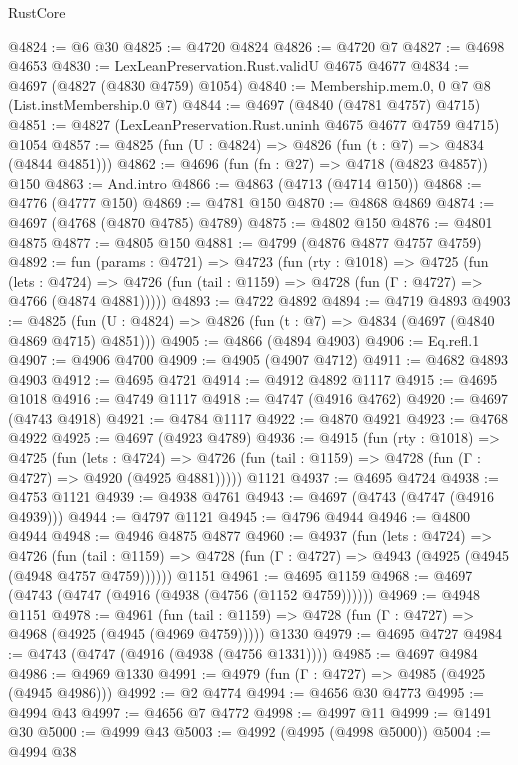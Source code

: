 \begin{lexlean}{RustCore}
\begin{coremodule}
@4824 := @6 @30
@4825 := @4720 @4824
@4826 := @4720 @7
@4827 := @4698 @4653
@4830 := LexLeanPreservation.Rust.validU @4675 @4677
@4834 := @4697 (@4827 (@4830 @4759) @1054)
@4840 := Membership.mem.{0, 0} @7 @8 (List.instMembership.{0} @7)
@4844 := @4697 (@4840 (@4781 @4757) @4715)
@4851 := @4827 (LexLeanPreservation.Rust.uninh @4675 @4677 @4759 @4715) @1054
@4857 := @4825 (fun (U : @4824) => @4826 (fun (t : @7) => @4834 (@4844 @4851)))
@4862 := @4696 (fun (fn : @27) => @4718 (@4823 @4857)) @150
@4863 := And.intro
@4866 := @4863 (@4713 (@4714 @150))
@4868 := @4776 (@4777 @150)
@4869 := @4781 @150
@4870 := @4868 @4869
@4874 := @4697 (@4768 (@4870 @4785) @4789)
@4875 := @4802 @150
@4876 := @4801 @4875
@4877 := @4805 @150
@4881 := @4799 (@4876 @4877 @4757 @4759)
@4892 := fun (params : @4721) =>
  @4723
    (fun (rty : @1018) =>
    @4725
      (fun (lets : @4724) =>
      @4726 (fun (tail : @1159) => @4728 (fun (Γ : @4727) => @4766 (@4874 @4881)))))
@4893 := @4722 @4892
@4894 := @4719 @4893
@4903 := @4825 (fun (U : @4824) => @4826 (fun (t : @7) => @4834 (@4697 (@4840 @4869 @4715) @4851)))
@4905 := @4866 (@4894 @4903)
@4906 := Eq.refl.{1}
@4907 := @4906 @4700
@4909 := @4905 (@4907 @4712)
@4911 := @4682 @4893 @4903
@4912 := @4695 @4721
@4914 := @4912 @4892 @1117
@4915 := @4695 @1018
@4916 := @4749 @1117
@4918 := @4747 (@4916 @4762)
@4920 := @4697 (@4743 @4918)
@4921 := @4784 @1117
@4922 := @4870 @4921
@4923 := @4768 @4922
@4925 := @4697 (@4923 @4789)
@4936 := @4915
    (fun (rty : @1018) =>
    @4725
      (fun (lets : @4724) =>
      @4726 (fun (tail : @1159) => @4728 (fun (Γ : @4727) => @4920 (@4925 @4881)))))
    @1121
@4937 := @4695 @4724
@4938 := @4753 @1121
@4939 := @4938 @4761
@4943 := @4697 (@4743 (@4747 (@4916 @4939)))
@4944 := @4797 @1121
@4945 := @4796 @4944
@4946 := @4800 @4944
@4948 := @4946 @4875 @4877
@4960 := @4937
    (fun (lets : @4724) =>
    @4726
      (fun (tail : @1159) => @4728 (fun (Γ : @4727) => @4943 (@4925 (@4945 (@4948 @4757 @4759))))))
    @1151
@4961 := @4695 @1159
@4968 := @4697 (@4743 (@4747 (@4916 (@4938 (@4756 (@1152 @4759))))))
@4969 := @4948 @1151
@4978 := @4961
    (fun (tail : @1159) => @4728 (fun (Γ : @4727) => @4968 (@4925 (@4945 (@4969 @4759)))))
    @1330
@4979 := @4695 @4727
@4984 := @4743 (@4747 (@4916 (@4938 (@4756 @1331))))
@4985 := @4697 @4984
@4986 := @4969 @1330
@4991 := @4979 (fun (Γ : @4727) => @4985 (@4925 (@4945 @4986)))
@4992 := @2 @4774
@4994 := @4656 @30 @4773
@4995 := @4994 @43
@4997 := @4656 @7 @4772
@4998 := @4997 @11
@4999 := @1491 @30
@5000 := @4999 @43
@5003 := @4992 (@4995 (@4998 @5000))
@5004 := @4994 @38

\end{coremodule}
\end{lexlean}

